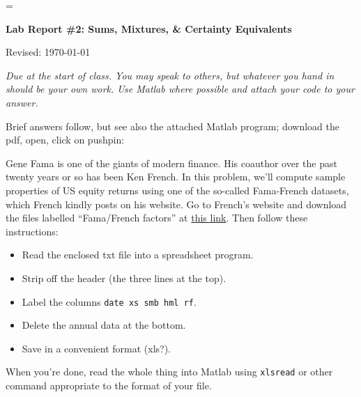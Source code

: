 \documentclass[11pt]{exam}
\begin{document}
\parskip=\bigskipamount
\parindent=0.0in
\thispagestyle{empty}


\bigskip\bigskip
\centerline{\Large \bf Lab Report \#2: Sums, Mixtures, \& Certainty Equivalents}
\centerline{Revised: \today}

\bigskip
{\it Due at the start of class.
You may speak to others, but whatever you hand in should be your own work.
Use Matlab where possible and attach your code to your answer.}

\begin{questions}

\begin{solution}
Brief answers follow,
but see also the attached Matlab program;
download the pdf, open, click on pushpin:
\end{solution}


Gene Fama is one of the giants of modern finance.
His coauthor over the past twenty years or so has been Ken French.
In this problem, we'll compute sample properties of US equity returns using
one of the so-called Fama-French datasets, which French kindly posts on his website.
Go to French's website and download the files labelled ``Fama/French factors''
at
\href{http://mba.tuck.dartmouth.edu/pages/faculty/ken.french/ftp/F-F_Research_Data_Factors.zip}
{this link}.
Then follow these instructions:
\begin{itemize}
\item Read the enclosed txt file into a spreadsheet program.
\item Strip off the header (the three lines at the top).
\item Label the columns {\tt date xs smb hml rf}.
\item Delete the annual data at the bottom.
\item Save in a convenient format (xls?).
\end{itemize}
When you're done, read the whole thing into Matlab using {\tt xlsread}
or other command appropriate to the format of your file.


\end{questions}
\end{document}
